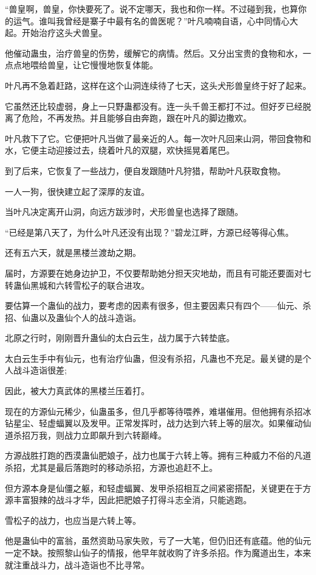 \begin{this_body}
“兽皇啊，兽皇，你快要死了。说不定哪天，我也和你一样。不过碰到我，也算你的运气。谁叫我曾经是寨子中最有名的兽医呢？”叶凡喃喃自语，心中同情心大起。开始治疗这头犬兽皇。

他催动蛊虫，治疗兽皇的伤势，缓解它的病情。然后。又分出宝贵的食物和水，一点点地喂给兽皇，让它慢慢地恢复体能。

叶凡再不急着赶路，这样在这个山洞连续待了七天，这头犬形兽皇终于好了起来。

它虽然还比较虚弱，身上一只野蛊都没有。连一头千兽王都打不过。但好歹已经脱离了危险，不再发热。并且能够自由奔跑，跟在叶凡的脚边撒欢。

叶凡救下了它。它便把叶凡当做了最亲近的人。每一次叶凡回来山洞，带回食物和水，它便主动迎接过去，绕着叶凡的双腿，欢快摇晃着尾巴。

到了后来，它恢复了一些战力，便自发跟随叶凡狩猎，帮助叶凡获取食物。

一人一狗，很快建立起了深厚的友谊。

当叶凡决定离开山洞，向远方跋涉时，犬形兽皇也选择了跟随。

“已经是第八天了，为什么叶凡还没有出现？”碧龙江畔，方源已经等得心焦。

还有五六天，就是黑楼兰渡劫之期。

届时，方源要在她身边护卫，不仅要帮助她分担天灾地劫，而且有可能还要面对七转蛊仙黑城和六转雪松子的联合进攻。

要估算一个蛊仙的战力，要考虑的因素有很多，但主要因素只有四个——仙元、杀招、仙蛊以及蛊仙个人的战斗造诣。

北原之行时，刚刚晋升蛊仙的太白云生，战力属于六转垫底。

太白云生手中有仙元，也有治疗仙蛊，但没有杀招，凡蛊也不充足。最关键的是个人战斗造诣很差;

因此，被大力真武体的黑楼兰压着打。

现在的方源仙元稀少，仙蛊虽多，但几乎都等待喂养，难堪催用。但他拥有杀招冰钻星尘、轻虚蝠翼以及发甲。正常发挥时，战力达到六转上等的层次。如果催动仙道杀招万我，则战力立即飙升到六转巅峰。

方源战胜打跑的西漠蛊仙肥娘子，战力也属于六转上等。拥有三种威力不俗的凡道杀招，尤其是最后落跑时的移动杀招，方源也追赶不上。

但方源本身是仙僵之躯，和轻虚蝠翼、发甲杀招相互之间紧密搭配，关键更在于方源丰富狠辣的战斗才华，因此把肥娘子打得斗志全消，只能逃跑。

雪松子的战力，也应当是六转上等。

他是蛊仙中的富翁，虽然资助马家失败，亏了一大笔，但仍旧还有底蕴。他的仙元一定不缺。按照黎山仙子的情报，他早年就收购了许多杀招。作为魔道出生，本来就注重战斗力，战斗造诣也不比寻常。


\end{this_body}
